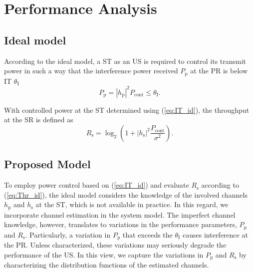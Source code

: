 \documentclass[letterpaper, twocolumn]{IEEEtran}
\newcommand{\e}[2]{{\mathbb E}_{#1}\left[ #2 \right]}
\newcommand{\sub}[1]{_{\text{#1}}}
\newcommand{\preg}{P\sub{cont}}
\newcommand{\pp}{P\sub{p}}
\newcommand{\ite}{\theta\sub{I}}
\newcommand{\rs}{R\sub{s}}
\newcommand{\trs}{R\sub{s}}
\newcommand{\gp}{h\sub{p}}
\newcommand{\gs}{h\sub{s}}
\newcommand{\pgp}{|h\sub{p}|^2}
\newcommand{\pgs}{|h\sub{s}|^2}
\newcommand{\nps}{\sigma^2}
\begin{document}

  
\section{Performance Analysis} \label{sec:et_ana}
\subsection{Ideal model}
According to the ideal model, a ST as an US is required to control its transmit power in such a way that the interference power received $\pp$ at the PR is below IT $\ite$ \cite{Xing07}
\begin{equation}
\pp = \pgp \preg \le \ite.
\label{eq:IT_id}
\end{equation}

With controlled power at the ST determined using (\ref{eq:IT_id}), the throughput at the SR is defined as
\begin{equation}
\rs = \log_2 \left(1 + \pgs \frac{\preg}{ \nps} \right). 
\label{eq:Thr_id}
\end{equation}
\subsection{Proposed Model} 
To employ power control based on (\ref{eq:IT_id}) and evaluate $\rs$ according to (\ref{eq:Thr_id}), the ideal model considers the knowledge of the involved channels $\gp$ and $\gs$ at the ST, which is not available in practice. In this regard, we incorporate channel estimation in the system model. The imperfect channel knowledge, however, translates to variations in the performance parameters, $\pp$ and $\trs$. Particularly, a variation in $\pp$ that exceeds the $\ite$ causes interference at the PR. Unless characterized, these variations may seriously degrade the performance of the US. In this view, we capture the variations in $\pp$ and $\trs$ by characterizing the distribution functions of the estimated channels.
\end{document}
